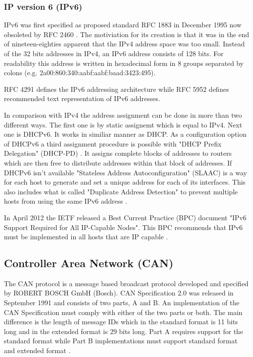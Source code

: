 \subsubsection{IP version 6 (IPv6)}
IPv6 was first specified as proposed standard RFC 1883 \cite{web:rfc1883} in
December 1995 now obsoleted by RFC 2460 \cite{web:rfc2460}. The motiviation for
its creation is that it was in the end of nineteen-eighties apparent that the
IPv4 address space was too small. Instead of the 32 bits addresses in IPv4, an
IPv6 address consists of 128 bits. For readability this address is
written in hexadecimal form in 8 groups separated by colons
(e.g. 2a00:860:340:aabf:aabf:baad:3423:495).

RFC 4291 defines the IPv6
addressing architecture \cite{web:rfc4291} while RFC 5952 \cite{web:rfc5952}
defines recommended text representation of IPv6 addresses.

In comparison with IPv4 the address assignment can be done in more than two different
ways. The first one is by static assignemt which is equal to IPv4.
Next one is DHCPv6. It works in similiar manner
\cite{web:rfc3315} as DHCP. As a configuration option of DHCPv6 a third
assignment procedure is possible with "DHCP
Prefix Delegation" (DHCP-PD) \cite{web:rfc3633}. It assigns complete blocks of
addresses to routers which are then free to distribute addresses within that
block of addresses. If DHCPv6 isn't available "Stateless Address
Autoconfiguration" (SLAAC) is a way for each host to generate and set a unique
address for each of its interfaces.
This also includes what is called "Duplicate Address Detection" to prevent
multiple hosts from using the same IPv6 address \cite{web:rfc4862, web:rfc4941}.

In April 2012 the IETF released a Best Current Practice (BPC) document
"IPv6 Support Required for All IP-Capable Nodes". This BPC recommends that
IPv6 must be implemented in all hosts that are IP capable \cite{web:rfc6540}.

\subsection{Controller Area Network (CAN)}
The CAN protocol is a message based broadcast protocol developed and specified
by ROBERT BOSCH GmbH (Bosch). CAN Specification 2.0 was released in September
1991 and consists of two parts, A and B. An implementation of the CAN
Specification must comply with either of the two parts or both. The main
difference is the length of message IDs which in the standard format is 11 bits
long and in the extended format is 29 bits long. Part A requires support for
the standard format while Part B implementations must support
standard format and extended format \cite{standard:can_bus}.

